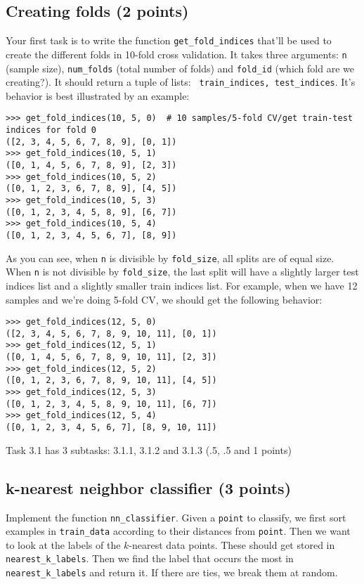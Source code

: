 \documentclass{article}
\begin{document}
\subsection{Creating folds (2 points)}

Your first task is to write the function {\tt get\_fold\_indices} that'll be used to create the different folds in 10-fold cross validation. It takes three arguments:
{\tt n} (sample size), {\tt num\_folds} (total number of folds) and {\tt fold\_id} (which fold are we creating?). It should return a tuple of lists: {\tt
train\_indices, test\_indices}. It's behavior is best illustrated by an example:
\begin{verbatim}
>>> get_fold_indices(10, 5, 0)  # 10 samples/5-fold CV/get train-test indices for fold 0
([2, 3, 4, 5, 6, 7, 8, 9], [0, 1])
>>> get_fold_indices(10, 5, 1)
([0, 1, 4, 5, 6, 7, 8, 9], [2, 3])
>>> get_fold_indices(10, 5, 2)
([0, 1, 2, 3, 6, 7, 8, 9], [4, 5])
>>> get_fold_indices(10, 5, 3)
([0, 1, 2, 3, 4, 5, 8, 9], [6, 7])
>>> get_fold_indices(10, 5, 4)
([0, 1, 2, 3, 4, 5, 6, 7], [8, 9])
\end{verbatim}

As you can see, when {\tt n} is divisible by {\tt fold\_size}, all splits are of equal size. When {\tt n} is not divisible by {\tt fold\_size}, the last split will have a slightly larger
test indices list and a slightly smaller train indices list. For example, when we have 12 samples and we're doing 5-fold CV, we should get the following behavior:
\begin{verbatim}
>>> get_fold_indices(12, 5, 0)
([2, 3, 4, 5, 6, 7, 8, 9, 10, 11], [0, 1])
>>> get_fold_indices(12, 5, 1)
([0, 1, 4, 5, 6, 7, 8, 9, 10, 11], [2, 3])
>>> get_fold_indices(12, 5, 2)
([0, 1, 2, 3, 6, 7, 8, 9, 10, 11], [4, 5])
>>> get_fold_indices(12, 5, 3)
([0, 1, 2, 3, 4, 5, 8, 9, 10, 11], [6, 7])
>>> get_fold_indices(12, 5, 4)
([0, 1, 2, 3, 4, 5, 6, 7], [8, 9, 10, 11])
\end{verbatim}

Task 3.1 has 3 subtasks: 3.1.1, 3.1.2 and 3.1.3 (.5, .5 and 1 points)

\subsection{k-nearest neighbor classifier (3 points)}

Implement the function {\tt nn\_classifier}. Given a {\tt point} to classify, we first sort examples in {\tt train\_data} according to their distances from {\tt point}. Then we
want to look at the labels of the $k$-nearest data points. These should get stored in {\tt nearest\_k\_labels}. Then we find the label that occurs the most in 
{\tt nearest\_k\_labels} and return it. If there are ties, we break them at random.
\end{document}
